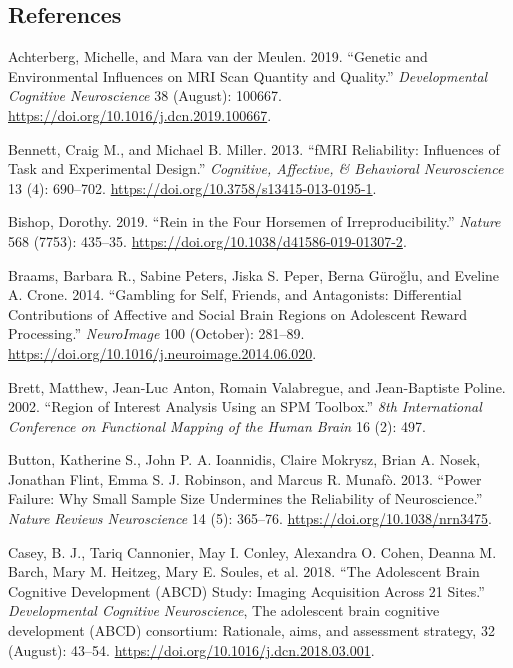 \documentclass[
  letterpaper,
  DIV=11,
  numbers=noendperiod]{scrartcl}
\newlength{\cslhangindent}
\newenvironment{CSLReferences}[2] %
 {\begin{list}{}{%
  \setlength{\itemindent}{0pt}
  \setlength{\leftmargin}{0pt}
  \setlength{\parsep}{0pt}
  \ifodd #1
   \setlength{\leftmargin}{\cslhangindent}
   \setlength{\itemindent}{-1\cslhangindent}
  \fi
  \setlength{\itemsep}{#2\baselineskip}}}
 {\end{list}}
\begin{document}
\subsection*{References}\label{references}

\label{refs}
\begin{CSLReferences}{1}{0}
Achterberg, Michelle, and Mara van der Meulen. 2019. {``Genetic and
Environmental Influences on MRI Scan Quantity and Quality.''}
\emph{Developmental Cognitive Neuroscience} 38 (August): 100667.
\url{https://doi.org/10.1016/j.dcn.2019.100667}.

Bennett, Craig M., and Michael B. Miller. 2013. {``fMRI Reliability:
Influences of Task and Experimental Design.''} \emph{Cognitive,
Affective, \& Behavioral Neuroscience} 13 (4): 690--702.
\url{https://doi.org/10.3758/s13415-013-0195-1}.

Bishop, Dorothy. 2019. {``Rein in the Four Horsemen of
Irreproducibility.''} \emph{Nature} 568 (7753): 435--35.
\url{https://doi.org/10.1038/d41586-019-01307-2}.

Braams, Barbara R., Sabine Peters, Jiska S. Peper, Berna Güroğlu, and
Eveline A. Crone. 2014. {``Gambling for Self, Friends, and Antagonists:
Differential Contributions of Affective and Social Brain Regions on
Adolescent Reward Processing.''} \emph{NeuroImage} 100 (October):
281--89. \url{https://doi.org/10.1016/j.neuroimage.2014.06.020}.

Brett, Matthew, Jean-Luc Anton, Romain Valabregue, and Jean-Baptiste
Poline. 2002. {``Region of Interest Analysis Using an SPM Toolbox.''}
\emph{8th International Conference on Functional Mapping of the Human
Brain} 16 (2): 497.

Button, Katherine S., John P. A. Ioannidis, Claire Mokrysz, Brian A.
Nosek, Jonathan Flint, Emma S. J. Robinson, and Marcus R. Munafò. 2013.
{``Power Failure: Why Small Sample Size Undermines the Reliability of
Neuroscience.''} \emph{Nature Reviews Neuroscience} 14 (5): 365--76.
\url{https://doi.org/10.1038/nrn3475}.

Casey, B. J., Tariq Cannonier, May I. Conley, Alexandra O. Cohen, Deanna
M. Barch, Mary M. Heitzeg, Mary E. Soules, et al. 2018. {``The
Adolescent Brain Cognitive Development (ABCD) Study: Imaging Acquisition
Across 21 Sites.''} \emph{Developmental Cognitive Neuroscience}, The
adolescent brain cognitive development (ABCD) consortium: Rationale,
aims, and assessment strategy, 32 (August): 43--54.
\url{https://doi.org/10.1016/j.dcn.2018.03.001}.


\end{CSLReferences}
\end{document}
